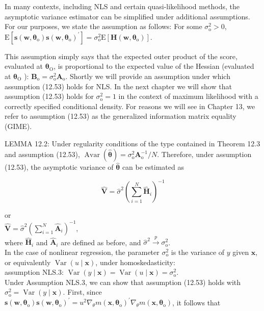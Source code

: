 \documentclass[10pt]{article}
\begin{document}
In many contexts, including NLS and certain quasi-likelihood methods, the asymptotic variance estimator can be simplified under additional assumptions. For our purposes, we state the assumption as follows: For some $\sigma_{\mathrm{o}}^{2}>0$,\\
$\mathrm{E}\left[\mathbf{s}\left(\mathbf{w}, \boldsymbol{\theta}_{\mathrm{o}}\right) \mathbf{s}\left(\mathbf{w}, \boldsymbol{\theta}_{\mathrm{o}}\right)^{\prime}\right]=\sigma_{\mathrm{o}}^{2} \mathrm{E}\left[\mathbf{H}\left(\mathbf{w}, \boldsymbol{\theta}_{\mathrm{o}}\right)\right]$.

This assumption simply says that the expected outer product of the score, evaluated at $\boldsymbol{\theta}_{\mathrm{O}}$, is proportional to the expected value of the Hessian (evaluated at $\boldsymbol{\theta}_{\mathrm{O}}$ ): $\mathbf{B}_{\mathrm{o}}= \sigma_{\mathrm{o}}^{2} \mathbf{A}_{\mathrm{o}}$. Shortly we will provide an assumption under which assumption (12.53) holds for NLS. In the next chapter we will show that assumption (12.53) holds for $\sigma_{\mathrm{o}}^{2}=1$ in the context of maximum likelihood with a correctly specified conditional density. For reasons we will see in Chapter 13, we refer to assumption (12.53) as the generalized information matrix equality (GIME).

LEMMA 12.2: Under regularity conditions of the type contained in Theorem 12.3 and assumption (12.53), $\operatorname{Avar}(\hat{\boldsymbol{\theta}})=\sigma_{\mathrm{o}}^{2} \mathbf{A}_{\mathrm{o}}^{-1} / N$. Therefore, under assumption (12.53), the asymptotic variance of $\hat{\boldsymbol{\theta}}$ can be estimated as


\begin{equation*}
\hat{\mathbf{V}}=\hat{\sigma}^{2}\left(\sum_{i=1}^{N} \hat{\mathbf{H}}_{i}\right)^{-1} \tag{12.54}
\end{equation*}


or\\
$\hat{\mathbf{V}}=\hat{\sigma}^{2}\left(\sum_{i=1}^{N} \hat{\mathbf{A}}_{i}\right)^{-1}$,\\
where $\hat{\mathbf{H}}_{i}$ and $\hat{\mathbf{A}}_{i}$ are defined as before, and $\hat{\sigma}^{2} \xrightarrow{p} \sigma_{\mathrm{o}}^{2}$.\\
In the case of nonlinear regression, the parameter $\sigma_{\mathrm{o}}^{2}$ is the variance of $y$ given $\mathbf{x}$, or equivalently $\operatorname{Var}(u \mid \mathbf{x})$, under homoskedasticity:\\
assumption NLS.3: $\operatorname{Var}(y \mid \mathbf{x})=\operatorname{Var}(u \mid \mathbf{x})=\sigma_{\mathrm{o}}^{2}$.\\
Under Assumption NLS.3, we can show that assumption (12.53) holds with $\sigma_{\mathrm{o}}^{2}= \operatorname{Var}(y \mid \mathbf{x})$. First, since $\mathbf{s}\left(\mathbf{w}, \boldsymbol{\theta}_{\mathrm{o}}\right) \mathbf{s}\left(\mathbf{w}, \boldsymbol{\theta}_{\mathrm{o}}\right)^{\prime}=u^{2} \nabla_{\theta} m\left(\mathbf{x}, \boldsymbol{\theta}_{\mathrm{o}}\right)^{\prime} \nabla_{\theta} m\left(\mathbf{x}, \boldsymbol{\theta}_{\mathrm{o}}\right)$, it follows that
\end{document}
